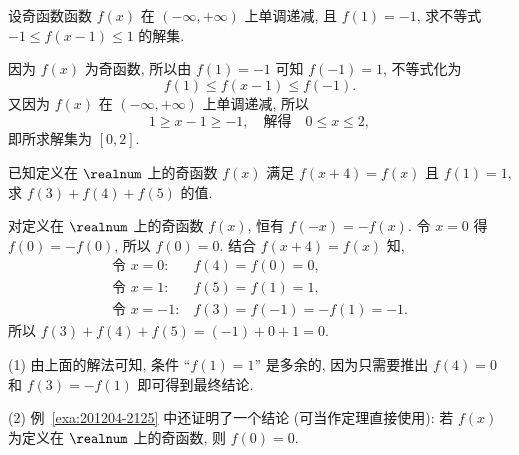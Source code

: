 \begin{example}
    设奇函数函数 $f(x)$ 在 $(-\infty,+\infty)$ 上单调递减, 且 $f(1)=-1$, 求不等式 $-1\leqslant f(x-1)\leqslant 1$ 的解集.
\end{example}
\begin{solution}
    因为 $f(x)$ 为奇函数, 所以由 $f(1)=-1$ 可知 $f(-1)=1$, 不等式化为
    \[f(1)\leqslant f(x-1)\leqslant f(-1).\]
    又因为 $f(x)$ 在 $(-\infty,+\infty)$ 上单调递减, 所以
    \[1\geqslant x-1\geqslant -1,\quad\text{解得}\quad 
        0\leqslant x\leqslant 2,\]
    即所求解集为 $[0,2]$.
\end{solution}

\begin{example}\label{exa:201204-2125}
    已知定义在 $\realnum$ 上的奇函数 $f(x)$ 满足 $f(x+4)=f(x)$ 且 $f(1)=1$, 求 $f(3)+f(4)+f(5)$ 的值.
\end{example}
\begin{solution}
    对定义在 $\realnum$ 上的奇函数 $f(x)$, 恒有 $f(-x)=-f(x)$. 令 $x=0$ 得 $f(0)=-f(0)$, 所以 $f(0)=0$. 结合 $f(x+4)=f(x)$ 知,
    \[\begin{aligned}
        \text{令 $x=0$:}&\ f(4)=f(0)=0,\\
        \text{令 $x=1$:}&\ f(5)=f(1)=1,\\
        \text{令 $x=-1$:}&\ f(3)=f(-1)=-f(1)=-1.
    \end{aligned}\]
    所以 $f(3)+f(4)+f(5)= (-1)+0+1=0$.
\end{solution}

\begin{remark}
    (1) 由上面的解法可知, 条件 ``$f(1)=1$'' 是多余的, 因为只需要推出 $f(4)=0$ 和 $f(3)=-f(1)$ 即可得到最终结论.
    
    (2) 例~\ref{exa:201204-2125} 中还证明了一个结论 (可当作定理直接使用): 若 $f(x)$ 为定义在 $\realnum$ 上的奇函数, 则 $f(0)=0$.
\end{remark}